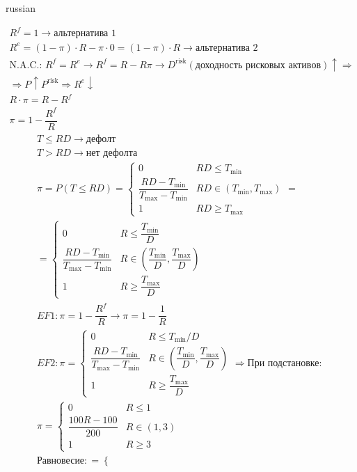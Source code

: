 \documentclass{article}
\begin{document}
\begin{otherlanguage*}{russian}
\begin{itemize}
\begin{align*}
R^f = 1 \rightarrow	 \text{альтернатива 1 } \\
R^e = (1 - \pi) \cdot R - \pi \cdot 0 = (1 - \pi) \cdot R \rightarrow \text{альтернатива 2 } \\
\text{N.A.C.: } R^f = R^e \rightarrow R^f = R - R \pi \rightarrow D^{\text{risk}} (\text{доходность рисковых активов}) \uparrow \Rightarrow \\  \Rightarrow P \uparrow P^{\text{risk}} \Rightarrow R^{e} \downarrow \\
R \cdot \pi = R - R^f \\
\pi  = 1 - \dfrac{R^f}{R}
\end{align*}
\begin{align*}
T \le RD \rightarrow  \text{дефолт} \\
T > RD \rightarrow \text{нет дефолта} \\
\pi = P (T \le RD) = \begin{cases}
0 & RD \le T_{\min} \\
\dfrac{RD - T_{\min}}{T_{\max} - T_{\min}} & RD \in (T_{\min}, T_{\max} ) \\
1 & RD \ge T_{\max} 
\end{cases} = \\
= 
\begin{cases}
0 & R \le \dfrac{T_{\min}}{D} \\
\dfrac{RD - T_{\min}}{T_{\max} - T_{\min	}} & R \in (\dfrac{T_{\min}}{D}, \dfrac{T_{\max}}{D}) \\
1 & R \ge  \dfrac{T_{\max}}{D}
\end{cases}  \\
EF1: \pi = 1 - \dfrac{R^f}{R} \rightarrow \pi = 1 - \dfrac{1}{R} \\
EF2:\pi =  
\begin{cases} 0 & R \le T_{\min} / D \\
\dfrac{RD - T_{\min}}{T_{\max} - T_{\min}} & R \in (\dfrac{T_{\min}}{D}, \dfrac{T_{\max}}{D} ) \\
1 & R \ge \dfrac{T_{\max}}{D}
\end{cases} \Rightarrow \text{При подстановке: } \\
\pi = \begin{cases}
0 & R \le 1 \\
\dfrac{100 R - 100}{200} & R \in (1, 3) \\
1 & R \ge 3 
\end{cases} \\
\text{Равновесие}: = \begin{cases}

\end{cases}
\end{align*}
\end{itemize}
\end{otherlanguage*}
\end{document}
